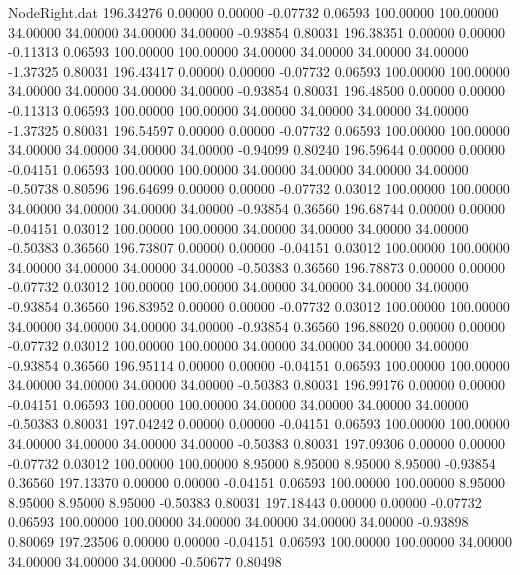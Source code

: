 \begin{filecontents}{NodeRight.dat}
 196.34276    0.00000    0.00000    -0.07732    0.06593  100.00000  100.00000   34.00000   34.00000   34.00000   34.00000   -0.93854    0.80031
 196.38351    0.00000    0.00000    -0.11313    0.06593  100.00000  100.00000   34.00000   34.00000   34.00000   34.00000   -1.37325    0.80031
 196.43417    0.00000    0.00000    -0.07732    0.06593  100.00000  100.00000   34.00000   34.00000   34.00000   34.00000   -0.93854    0.80031
 196.48500    0.00000    0.00000    -0.11313    0.06593  100.00000  100.00000   34.00000   34.00000   34.00000   34.00000   -1.37325    0.80031
 196.54597    0.00000    0.00000    -0.07732    0.06593  100.00000  100.00000   34.00000   34.00000   34.00000   34.00000   -0.94099    0.80240
 196.59644    0.00000    0.00000    -0.04151    0.06593  100.00000  100.00000   34.00000   34.00000   34.00000   34.00000   -0.50738    0.80596
 196.64699    0.00000    0.00000    -0.07732    0.03012  100.00000  100.00000   34.00000   34.00000   34.00000   34.00000   -0.93854    0.36560
 196.68744    0.00000    0.00000    -0.04151    0.03012  100.00000  100.00000   34.00000   34.00000   34.00000   34.00000   -0.50383    0.36560
 196.73807    0.00000    0.00000    -0.04151    0.03012  100.00000  100.00000   34.00000   34.00000   34.00000   34.00000   -0.50383    0.36560
 196.78873    0.00000    0.00000    -0.07732    0.03012  100.00000  100.00000   34.00000   34.00000   34.00000   34.00000   -0.93854    0.36560
 196.83952    0.00000    0.00000    -0.07732    0.03012  100.00000  100.00000   34.00000   34.00000   34.00000   34.00000   -0.93854    0.36560
 196.88020    0.00000    0.00000    -0.07732    0.03012  100.00000  100.00000   34.00000   34.00000   34.00000   34.00000   -0.93854    0.36560
 196.95114    0.00000    0.00000    -0.04151    0.06593  100.00000  100.00000   34.00000   34.00000   34.00000   34.00000   -0.50383    0.80031
 196.99176    0.00000    0.00000    -0.04151    0.06593  100.00000  100.00000   34.00000   34.00000   34.00000   34.00000   -0.50383    0.80031
 197.04242    0.00000    0.00000    -0.04151    0.06593  100.00000  100.00000   34.00000   34.00000   34.00000   34.00000   -0.50383    0.80031
 197.09306    0.00000    0.00000    -0.07732    0.03012  100.00000  100.00000    8.95000    8.95000    8.95000    8.95000   -0.93854    0.36560
 197.13370    0.00000    0.00000    -0.04151    0.06593  100.00000  100.00000    8.95000    8.95000    8.95000    8.95000   -0.50383    0.80031
 197.18443    0.00000    0.00000    -0.07732    0.06593  100.00000  100.00000   34.00000   34.00000   34.00000   34.00000   -0.93898    0.80069
 197.23506    0.00000    0.00000    -0.04151    0.06593  100.00000  100.00000   34.00000   34.00000   34.00000   34.00000   -0.50677    0.80498

\end{filecontents}
